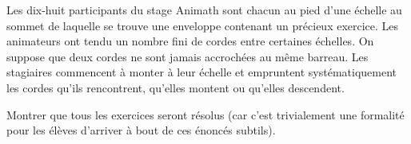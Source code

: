 Les dix-huit participants du stage Animath sont chacun au pied d'une échelle au sommet de laquelle se trouve une enveloppe contenant un précieux exercice. Les animateurs ont tendu un nombre fini de cordes entre certaines échelles. On suppose que deux cordes ne sont jamais accrochées au même barreau. Les stagiaires commencent à monter à leur échelle et empruntent systématiquement les cordes qu'ils rencontrent, qu'elles montent ou qu'elles descendent.

Montrer que tous les exercices seront résolus (car c'est trivialement une formalité pour les élèves d'arriver à bout de ces énoncés subtils).
